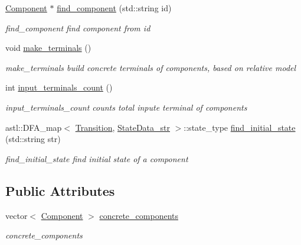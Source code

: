 \begin{DoxyCompactItemize}
\hyperlink{class_component}{Component} $\ast$ \hyperlink{class_problem_node_a96315dd81607e0807b6cc17d08cd9685}{find\+\_\+component} (std\+::string id)
\begin{DoxyCompactList}\small\item\em find\+\_\+component find component from id \end{DoxyCompactList}\item 
void \hyperlink{class_problem_node_a9ab02d7d90e07278bf96e554eab93ef6}{make\+\_\+terminals} ()\hypertarget{class_problem_node_a9ab02d7d90e07278bf96e554eab93ef6}{}\label{class_problem_node_a9ab02d7d90e07278bf96e554eab93ef6}

\begin{DoxyCompactList}\small\item\em make\+\_\+terminals build concrete terminals of components, based on relative model \end{DoxyCompactList}\item 
int \hyperlink{class_problem_node_a77aace2dc6e8df3bbfa07c0c99e56f12}{input\+\_\+terminals\+\_\+count} ()
\begin{DoxyCompactList}\small\item\em input\+\_\+terminals\+\_\+count counts total inpute terminal of components \end{DoxyCompactList}\item 
astl\+::\+D\+F\+A\+\_\+map$<$ \hyperlink{class_transition}{Transition}, \hyperlink{class_state_data__str}{State\+Data\+\_\+str} $>$\+::state\+\_\+type \hyperlink{class_problem_node_af24c9aaa0b19f79eb03811e156c30bc6}{find\+\_\+initial\+\_\+state} (std\+::string str)
\begin{DoxyCompactList}\small\item\em find\+\_\+initial\+\_\+state find initial state of a component \end{DoxyCompactList}\end{DoxyCompactItemize}
\subsection*{Public Attributes}
\begin{DoxyCompactItemize}
\item 
vector$<$ \hyperlink{class_component}{Component} $>$ \hyperlink{class_problem_node_ab11f2bfb638d6c5fca4e0dae4c8d4666}{concrete\+\_\+components}\hypertarget{class_problem_node_ab11f2bfb638d6c5fca4e0dae4c8d4666}{}\label{class_problem_node_ab11f2bfb638d6c5fca4e0dae4c8d4666}

\begin{DoxyCompactList}\small\item\em concrete\+\_\+components \end{DoxyCompactList}\end{DoxyCompactItemize}
